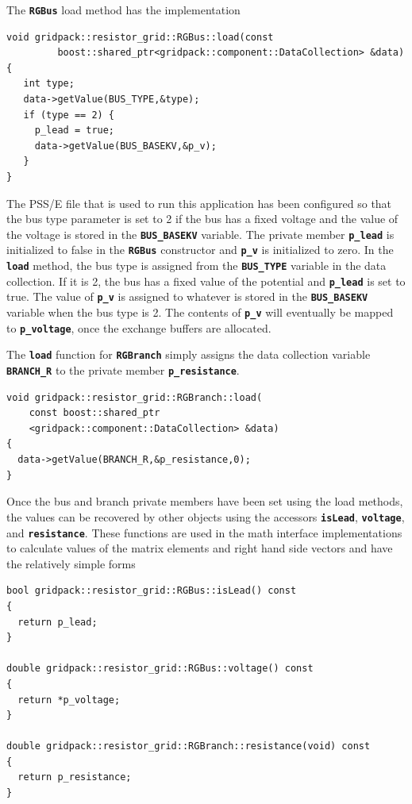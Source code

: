 The \texttt{\textbf{RGBus}} load method has the implementation

{
\color{red}
\begin{Verbatim}[fontseries=b]
void gridpack::resistor_grid::RGBus::load(const
         boost::shared_ptr<gridpack::component::DataCollection> &data)
{
   int type;
   data->getValue(BUS_TYPE,&type);
   if (type == 2) {
     p_lead = true;
     data->getValue(BUS_BASEKV,&p_v);
   }
}
\end{Verbatim}
}

The PSS/E file that is used to run this application has been configured so that the bus type parameter is set to 2 if the bus has a fixed voltage and the value of the voltage is stored in the \texttt{\textbf{BUS\_BASEKV}} variable. The private member \texttt{\textbf{p\_lead}} is initialized to false in the \texttt{\textbf{RGBus}} constructor and \texttt{\textbf{p\_v}} is initialized to zero. In the \texttt{\textbf{load}} method, the bus type is assigned from the \texttt{\textbf{BUS\_TYPE}} variable in the data collection. If it is 2, the bus has a fixed value of the potential and \texttt{\textbf{p\_lead}} is set to true. The value of \texttt{\textbf{p\_v}} is assigned to whatever is stored in the \texttt{\textbf{BUS\_BASEKV}} variable when the bus type is 2. The contents of \texttt{\textbf{p\_v}} will eventually be mapped to \texttt{\textbf{p\_voltage}}, once the exchange buffers are allocated.

The \texttt{\textbf{load}} function for \texttt{\textbf{RGBranch}} simply assigns the data collection variable \texttt{\textbf{BRANCH\_R}} to the private member \texttt{\textbf{p\_resistance}}.

{
\color{red}
\begin{Verbatim}[fontseries=b]
void gridpack::resistor_grid::RGBranch::load(
    const boost::shared_ptr
    <gridpack::component::DataCollection> &data)
{
  data->getValue(BRANCH_R,&p_resistance,0);
}
\end{Verbatim}
}

Once the bus and branch private members have been set using the load methods, the values can be recovered by other objects using the accessors \texttt{\textbf{isLead}}, \texttt{\textbf{voltage}}, and \texttt{\textbf{resistance}}. These functions are used in the math interface implementations to calculate values of the matrix elements and right hand side vectors and have the relatively simple forms

{
\color{red}
\begin{Verbatim}[fontseries=b]
bool gridpack::resistor_grid::RGBus::isLead() const
{
  return p_lead;
}

double gridpack::resistor_grid::RGBus::voltage() const
{
  return *p_voltage;
}

double gridpack::resistor_grid::RGBranch::resistance(void) const
{
  return p_resistance;
}
\end{Verbatim}
}

